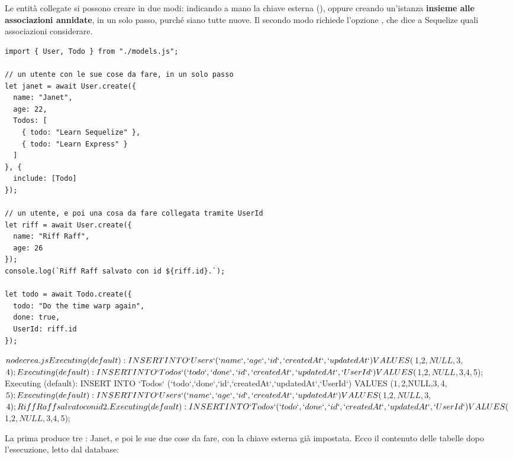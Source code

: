Le entità collegate si possono creare in due modi: indicando a mano la chiave
esterna (), oppure creando un'istanza \textbf{insieme alle
associazioni annidate}, in un solo passo, purché siano tutte nuove. Il secondo
modo richiede l'opzione , che dice a Sequelize quali associazioni
considerare.

\begin{lstlisting}[style=js, name=crea.js]
import { User, Todo } from "./models.js";

// un utente con le sue cose da fare, in un solo passo
let janet = await User.create({
  name: "Janet",
  age: 22,
  Todos: [
    { todo: "Learn Sequelize" },
    { todo: "Learn Express" }
  ]
}, {
  include: [Todo]
});

// un utente, e poi una cosa da fare collegata tramite UserId
let riff = await User.create({
  name: "Riff Raff",
  age: 26
});
console.log(`Riff Raff salvato con id ${riff.id}.`);

let todo = await Todo.create({
  todo: "Do the time warp again",
  done: true,
  UserId: riff.id
});
\end{lstlisting}

\begin{console}[Terminale]
$ node crea.js
Executing (default): INSERT INTO `Users` (`name`,`age`,`id`,`createdAt`,`updatedAt`) VALUES ($1,$2,NULL,$3,$4);
Executing (default): INSERT INTO `Todos` (`todo`,`done`,`id`,`createdAt`,`updatedAt`,`UserId`) VALUES ($1,$2,NULL,$3,$4,$5);
Executing (default): INSERT INTO `Todos` (`todo`,`done`,`id`,`createdAt`,`updatedAt`,`UserId`) VALUES ($1,$2,NULL,$3,$4,$5);
Executing (default): INSERT INTO `Users` (`name`,`age`,`id`,`createdAt`,`updatedAt`) VALUES ($1,$2,NULL,$3,$4);
Riff Raff salvato con id 2.
Executing (default): INSERT INTO `Todos` (`todo`,`done`,`id`,`createdAt`,`updatedAt`,`UserId`) VALUES ($1,$2,NULL,$3,$4,$5);
\end{console}

La prima  produce tre : Janet, e poi le sue due cose
da fare, con la chiave esterna già impostata. Ecco il contenuto delle tabelle
dopo l'esecuzione, letto dal database:

